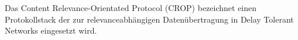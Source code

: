 Das Content Relevance-Orientated Protocol (CROP) bezeichnet einen Protokollstack
der zur relevanceabh{\"a}ngigen Daten{\"u}bertragung in Delay Tolerant Networks
eingesetzt wird.
